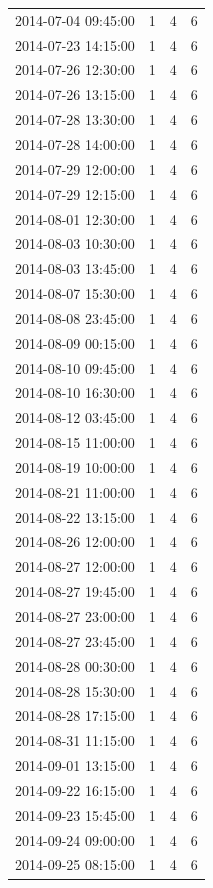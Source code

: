 \begin{tabular}{lrrr}
2014-07-04 09:45:00 & 1 & 4 & 6 \\
2014-07-23 14:15:00 & 1 & 4 & 6 \\
2014-07-26 12:30:00 & 1 & 4 & 6 \\
2014-07-26 13:15:00 & 1 & 4 & 6 \\
2014-07-28 13:30:00 & 1 & 4 & 6 \\
2014-07-28 14:00:00 & 1 & 4 & 6 \\
2014-07-29 12:00:00 & 1 & 4 & 6 \\
2014-07-29 12:15:00 & 1 & 4 & 6 \\
2014-08-01 12:30:00 & 1 & 4 & 6 \\
2014-08-03 10:30:00 & 1 & 4 & 6 \\
2014-08-03 13:45:00 & 1 & 4 & 6 \\
2014-08-07 15:30:00 & 1 & 4 & 6 \\
2014-08-08 23:45:00 & 1 & 4 & 6 \\
2014-08-09 00:15:00 & 1 & 4 & 6 \\
2014-08-10 09:45:00 & 1 & 4 & 6 \\
2014-08-10 16:30:00 & 1 & 4 & 6 \\
2014-08-12 03:45:00 & 1 & 4 & 6 \\
2014-08-15 11:00:00 & 1 & 4 & 6 \\
2014-08-19 10:00:00 & 1 & 4 & 6 \\
2014-08-21 11:00:00 & 1 & 4 & 6 \\
2014-08-22 13:15:00 & 1 & 4 & 6 \\
2014-08-26 12:00:00 & 1 & 4 & 6 \\
2014-08-27 12:00:00 & 1 & 4 & 6 \\
2014-08-27 19:45:00 & 1 & 4 & 6 \\
2014-08-27 23:00:00 & 1 & 4 & 6 \\
2014-08-27 23:45:00 & 1 & 4 & 6 \\
2014-08-28 00:30:00 & 1 & 4 & 6 \\
2014-08-28 15:30:00 & 1 & 4 & 6 \\
2014-08-28 17:15:00 & 1 & 4 & 6 \\
2014-08-31 11:15:00 & 1 & 4 & 6 \\
2014-09-01 13:15:00 & 1 & 4 & 6 \\
2014-09-22 16:15:00 & 1 & 4 & 6 \\
2014-09-23 15:45:00 & 1 & 4 & 6 \\
2014-09-24 09:00:00 & 1 & 4 & 6 \\
2014-09-25 08:15:00 & 1 & 4 & 6 \\

\end{tabular}
